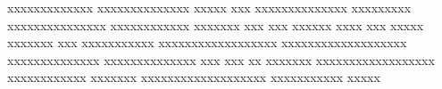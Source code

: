 %
\label{sec:AnhangXXX}
xxxxxxxxxxxxx xxxxxxxxxxxxxx xxxxx xxx xxxxxxxxxxxxxx xxxxxxxxx xxxxxxxxxxxxxxx xxxxxxxxxxxx xxxxxxx xxx xxx xxxxxx xxxx xxx xxxxx xxxxxxx xxx xxxxxxxxxxx xxxxxxxxxxxxxxxxxx xxxxxxxxxxxxxxxxxxx xxxxxxxxxxxxxx xxxxxxxxxxxxxx xxx xxx xx xxxxxxx xxxxxxxxxxxxxxxxxx xxxxxxxxxxxx xxxxxxx xxxxxxxxxxxxxxxxxxx xxxxxxxxxxx xxxxx
